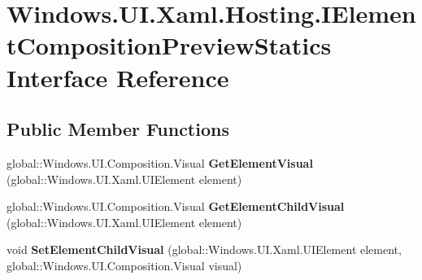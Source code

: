 \hypertarget{interface_windows_1_1_u_i_1_1_xaml_1_1_hosting_1_1_i_element_composition_preview_statics}{}\section{Windows.\+U\+I.\+Xaml.\+Hosting.\+I\+Element\+Composition\+Preview\+Statics Interface Reference}
\label{interface_windows_1_1_u_i_1_1_xaml_1_1_hosting_1_1_i_element_composition_preview_statics}
\subsection*{Public Member Functions}
\begin{DoxyCompactItemize}
\item 
\mbox{\label{interface_windows_1_1_u_i_1_1_xaml_1_1_hosting_1_1_i_element_composition_preview_statics_ae2b37785a6d7aebf56292ef6ef4b23c8}} 
global\+::\+Windows.\+U\+I.\+Composition.\+Visual {\bfseries Get\+Element\+Visual} (global\+::\+Windows.\+U\+I.\+Xaml.\+U\+I\+Element element)
\item 
\mbox{\label{interface_windows_1_1_u_i_1_1_xaml_1_1_hosting_1_1_i_element_composition_preview_statics_a5c60a91c9c5c8f2c885579f65b715542}} 
global\+::\+Windows.\+U\+I.\+Composition.\+Visual {\bfseries Get\+Element\+Child\+Visual} (global\+::\+Windows.\+U\+I.\+Xaml.\+U\+I\+Element element)
\item 
\mbox{\label{interface_windows_1_1_u_i_1_1_xaml_1_1_hosting_1_1_i_element_composition_preview_statics_ae6c5a85d72b3bb334c01c89b54803023}} 
void {\bfseries Set\+Element\+Child\+Visual} (global\+::\+Windows.\+U\+I.\+Xaml.\+U\+I\+Element element, global\+::\+Windows.\+U\+I.\+Composition.\+Visual visual)
\item 
\mbox{\label{interface_windows_1_1_u_i_1_1_xaml_1_1_hosting_1_1_i_element_composition_preview_statics_ab27d5dea22cc21e23a4eb65c45a18223}} 

\end{DoxyCompactItemize}

